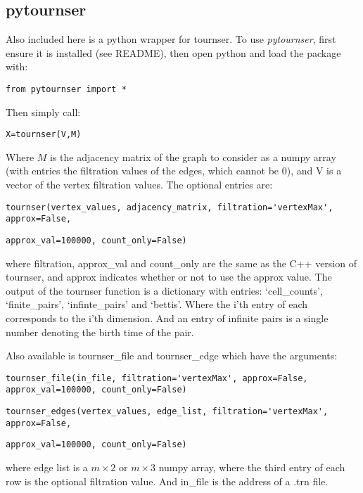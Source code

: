 \documentclass{amsart}
\theoremstyle{definition}
\begin{document}
\subsection{pytournser}
Also included here is a python wrapper for tournser. To use \textit{pytournser}, first ensure it is installed (see README), then open python and load the package with:
\begin{verbatim}from pytournser import *\end{verbatim}
Then simply call:
\begin{verbatim}X=tournser(V,M)\end{verbatim}
Where $M$ is the adjacency matrix of the graph to consider as a numpy array (with entries the filtration values of the edges, which cannot be $0$), and V is a vector of the vertex filtration values. The optional entries are:
\begin{verbatim}tournser(vertex_values, adjacency_matrix, filtration='vertexMax', approx=False,\end{verbatim} 
\begin{verbatim}approx_val=100000, count_only=False)\end{verbatim}
where filtration, approx\_val and count\_only are the same as the C++ version of tournser, and approx indicates whether or not to use the approx value. The output of the tournser function is a dictionary with entries: `cell\_counts', `finite\_pairs', `infinte\_pairs' and `bettis'. Where the i'th entry of each corresponds to the i'th dimension. And an entry of infinite pairs is a single number denoting the birth time of the pair.

Also available is tournser\_file and tournser\_edge which have the arguments:
\begin{verbatim}tournser_file(in_file, filtration='vertexMax', approx=False, approx_val=100000, count_only=False)\end{verbatim}
\begin{verbatim}tournser_edges(vertex_values, edge_list, filtration='vertexMax', approx=False,\end{verbatim}
\begin{verbatim}approx_val=100000, count_only=False)\end{verbatim}
where edge list is a $m\times2$ or $m\times 3$ numpy array, where the third entry of each row is the optional filtration value. And in\_file is the address of a .trn file.

\vfill
\end{document}
